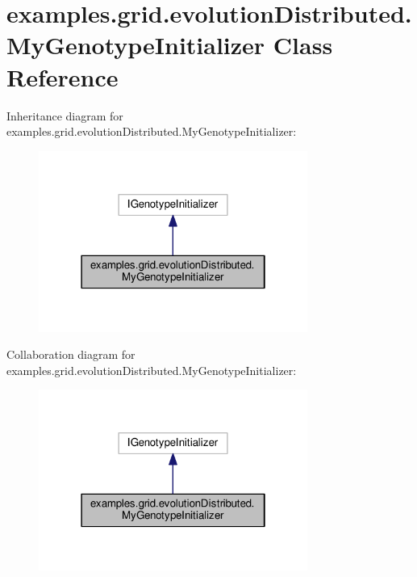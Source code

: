 \hypertarget{classexamples_1_1grid_1_1evolution_distributed_1_1_my_genotype_initializer}{\section{examples.\-grid.\-evolution\-Distributed.\-My\-Genotype\-Initializer Class Reference}
\label{classexamples_1_1grid_1_1evolution_distributed_1_1_my_genotype_initializer}
}


Inheritance diagram for examples.\-grid.\-evolution\-Distributed.\-My\-Genotype\-Initializer\-:
\nopagebreak
\begin{figure}[H]
\begin{center}
\leavevmode
\includegraphics[width=250pt]{classexamples_1_1grid_1_1evolution_distributed_1_1_my_genotype_initializer__inherit__graph}
\end{center}
\end{figure}


Collaboration diagram for examples.\-grid.\-evolution\-Distributed.\-My\-Genotype\-Initializer\-:
\nopagebreak
\begin{figure}[H]
\begin{center}
\leavevmode
\includegraphics[width=250pt]{classexamples_1_1grid_1_1evolution_distributed_1_1_my_genotype_initializer__coll__graph}
\end{center}
\end{figure}

